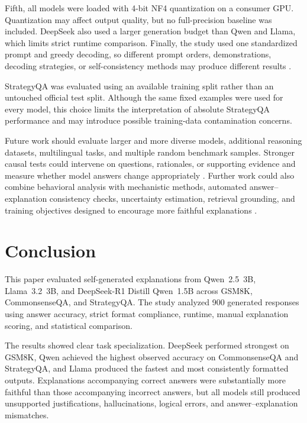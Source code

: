 \documentclass{article}
\begin{document}
Fifth, all models were loaded with 4-bit NF4 quantization on a consumer
GPU. Quantization may affect output quality, but no full-precision
baseline was included. DeepSeek also used a larger generation budget
than Qwen and Llama, which limits strict runtime comparison. Finally,
the study used one standardized prompt and greedy decoding, so different
prompt orders, demonstrations, decoding strategies, or self-consistency
methods may produce different results
\cite{wang2023selfconsistency,zhou2023least,yao2023tree}.

StrategyQA was evaluated using an available training split rather than
an untouched official test split. Although the same fixed examples were
used for every model, this choice limits the interpretation of absolute
StrategyQA performance and may introduce possible training-data
contamination concerns.

Future work should evaluate larger and more diverse models, additional
reasoning datasets, multilingual tasks, and multiple random benchmark
samples. Stronger causal tests could intervene on questions, rationales,
or supporting evidence and measure whether model answers change
appropriately
\cite{matton2025walk,yeo2025towards,zaman2025causal}.
Further work could also combine behavioral analysis with mechanistic
methods, automated answer--explanation consistency checks, uncertainty
estimation, retrieval grounding, and training objectives designed to
encourage more faithful explanations
\cite{manakul2023selfcheckgpt,farquhar2024semantic,
sui2025fidelis,doi2025training,chuang2026faithlm}.

\section{Conclusion}

This paper evaluated self-generated explanations from Qwen~2.5~3B,
Llama~3.2~3B, and DeepSeek-R1 Distill Qwen~1.5B across GSM8K,
CommonsenseQA, and StrategyQA. The study analyzed 900 generated
responses using answer accuracy, strict format compliance, runtime,
manual explanation scoring, and statistical comparison.

The results showed clear task specialization. DeepSeek performed
strongest on GSM8K, Qwen achieved the highest observed accuracy on
CommonsenseQA and StrategyQA, and Llama produced the fastest and most
consistently formatted outputs. Explanations accompanying correct
answers were substantially more faithful than those accompanying
incorrect answers, but all models still produced unsupported
justifications, hallucinations, logical errors, and
answer--explanation mismatches.
\end{document}
